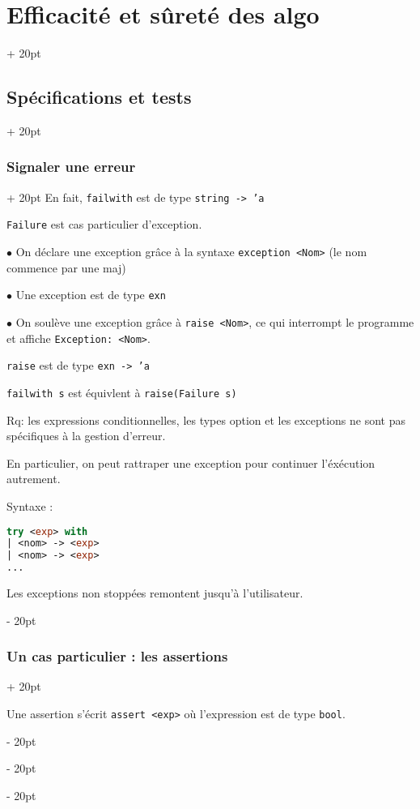 \documentclass[a4paper, 12pt, twoside]{article}
\newcommand{\ind}[1][20pt]{\advance\leftskip + #1}
\newcommand{\deind}[1][20pt]{\advance\leftskip - #1}
\newenvironment{indentedenv}[1][20pt]{\par \ind[#1]}{\par \deind}
\newenvironment{indt}[2][20pt]{#2 \begin{indentedenv}[#1]}{\end{indentedenv}} %
\begin{document}
\begin{indt}{\section{Efficacité et sûreté des algo}}
\begin{indt}{\subsection{Spécifications et tests}}
\begin{indt}{\subsubsection{Signaler une erreur}}
                En fait, \texttt{failwith} est de type \texttt{string -> 'a}
                
                \vspace{6pt}
                
                \texttt{Failure} est cas particulier d'exception.
                
                $\bullet$ On déclare une exception grâce à la syntaxe \texttt{exception <Nom>} (le nom commence par une maj)
                
                $\bullet$ Une exception est de type \texttt{exn}
                
                $\bullet$ On soulève une exception grâce à \texttt{raise <Nom>}, ce qui interrompt le programme et affiche \texttt{Exception: <Nom>}.
                
                \texttt{raise} est de type \texttt{exn -> 'a}
                
                \texttt{failwith s}  est équivlent à \texttt{raise(Failure s)}
                
                \vspace{6pt}
                
                Rq: les expressions conditionnelles, les types option et les exceptions ne sont pas spécifiques à la gestion d'erreur.
                
                En particulier, on peut rattraper une exception pour continuer l'éxécution autrement.
                
                Syntaxe :
                \begin{lstlisting}[language=Caml, xleftmargin=80pt]
try <exp> with
| <nom> -> <exp>
| <nom> -> <exp>
...
                \end{lstlisting}
                
                Les exceptions non stoppées remontent jusqu'à l'utilisateur.
            \end{indt}
            
            \vspace{12pt}
            
            \begin{indt}{\subsubsection{Un cas particulier : les assertions}}
                
                Une assertion s'écrit \texttt{assert <exp>} où l'expression est de type \texttt{bool}.
                

\end{indt}
\end{indt}
\end{indt}
\end{document}
